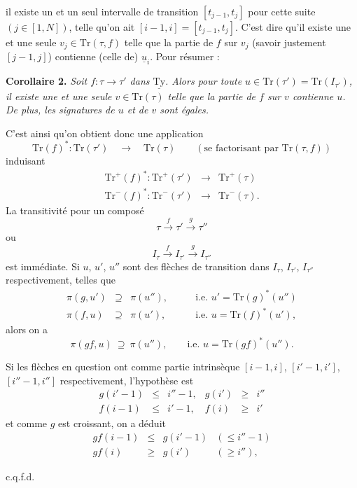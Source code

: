 \documentclass[11pt]{article}
\newcommand{\printedpage}[1]{\marginpar{\footnotesize p.~#1}}
\newcommand{\msp}[1]{\marginpar{\footnotesize [#1]}}
\newcommand{\Tr}{\mathrm{Tr}}
\newcommand{\uTy}{\underline{\mathrm{Ty}}}
\begin{document}
\printedpage{27}
\msp{page 42}
il existe un et un seul intervalle de transition $[t_{j-1}, t_j]$ pour cette suite $(j \in [1, N])$, telle qu'on ait $[i-1, i] = [t_{j-1}, t_j]$. C'est dire qu'il existe une et une seule $v_j \in \Tr(\tau, f)$ telle que la partie de $f$ sur $v_j$ (savoir justement $[j-1, j]$) contienne (celle de) $\underline{u}_i$. Pour résumer :

\textbf{Corollaire 2.} \textit{Soit $f : \tau \longrightarrow \tau'$ dans $\uTy$. Alors pour toute $u \in \Tr(\tau') = \Tr(I_{\tau'})$, il existe une et une seule $v \in \Tr(\tau)$ telle que la partie de $f$ sur $v$ contienne $u$. De plus, les signatures de $u$ et de $v$ sont égales.}

C'est ainsi qu'on obtient donc une application
\[
\Tr(f)^* : \Tr(\tau') \quad \longrightarrow \quad \Tr(\tau) \qquad (\text{se factorisant par } \Tr(\tau, f))
\]
induisant
\[
\begin{array}{rcl}
\Tr^+(f)^* : \Tr^+(\tau') & \longrightarrow & \Tr^+(\tau) \\
\Tr^-(f)^* : \Tr^-(\tau') & \longrightarrow & \Tr^-(\tau).
\end{array}
\]
La transitivité pour un composé
\[
\tau \xrightarrow{f} \tau' \xrightarrow{g} \tau''
\]
ou
\[
I_\tau \xrightarrow{f} I_{\tau'} \xrightarrow{g} I_{\tau''}
\]
est immédiate. Si $u$, $u'$, $u''$ sont des flèches de transition dans $I_\tau$, $I_{\tau'}$, $I_{\tau''}$ respectivement, telles que
\[
\begin{array}{rcll}
\pi(g, u') & \supseteq & \pi(u''), & \qquad \text{i.e. } u' = \Tr(g)^*(u'') \\
\pi(f, u) & \supseteq & \pi(u'), & \qquad \text{i.e. } u = \Tr(f)^*(u'),
\end{array}
\]
alors on a
\[
\pi(gf, u) \ \supseteq\ \pi(u''), \qquad \text{i.e. } u = \Tr(gf)^*(u'').
\]

\msp{page 43}
Si les flèches en question ont comme partie intrinsèque $[i-1, i]$, $[i'-1, i']$, $[i''-1, i'']$ respectivement, l'hypothèse est
\[
\begin{array}{rclrcl}
g(i'-1) & \leq & i''-1, & g(i') & \geq & i'' \\
f(i-1) & \leq & i'-1, & f(i) & \geq & i'
\end{array}
\]
et comme $g$ est croissant, on a déduit
\[
\begin{array}{rcll}
gf(i-1) & \leq & g(i'-1) & (\leq i''-1) \\
gf(i) & \geq & g(i') & (\geq i''),
\end{array}
\]
\begin{flushright}
c.q.f.d.
\end{flushright}
\end{document}
